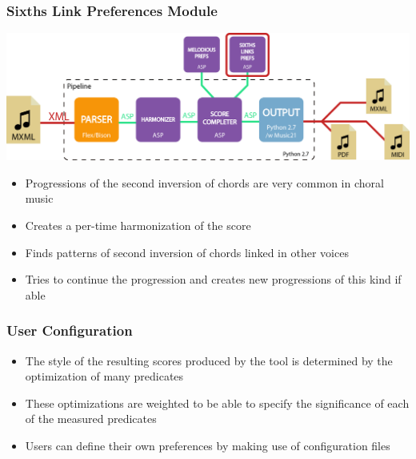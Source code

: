 \documentclass[english]{beamer}
\begin{document}
	\begin{frame}[t]
	\frametitle{Sixths Link Preferences Module}
	\begin{center}
			\includegraphics[width=0.6\linewidth]{imagenes/arch_trans/arquitectura_final_asp_pref_six.png}
			\end{center}
	\begin{itemize}
		\item Progressions of the second inversion of chords are very common in choral music
		\item Creates a per-time harmonization of the score
		\item Finds patterns of second inversion of chords linked in other voices
		\item Tries to continue the progression and creates new progressions of this kind if able
	\end{itemize}
	\end{frame}
	\begin{frame}
	\frametitle{User Configuration}
		\begin{itemize}
			\item The style of the resulting scores produced by the tool is determined by the optimization of many predicates
			\item These optimizations are weighted to be able to specify the significance of each of the measured predicates
			\item Users can define their own preferences by making use of configuration files
		\end{itemize}
	\end{frame}
\end{document}
